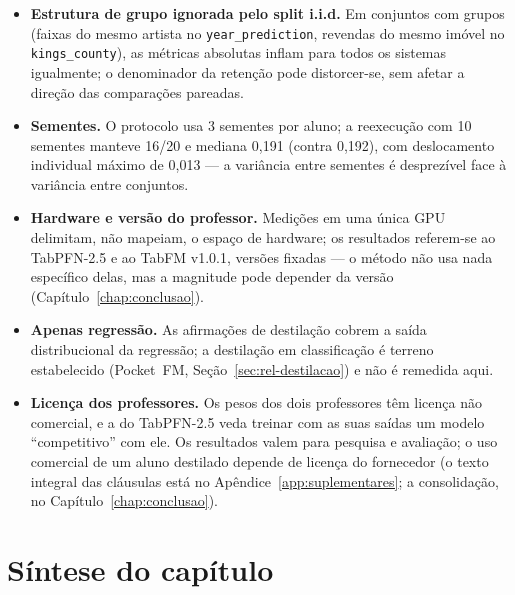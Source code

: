 \begin{itemize}
    Holm, ao nível de 5\%, no conjunto dos três testes de sinal
    principais (a manchete, com correção sequencial; E1; E3), os
    três se mantêm ($p$ ajustados $\approx 0{,}019$; $0{,}0026$;
    $0{,}0006$). Os instrumentos suplementares, já limítrofes
    isoladamente (Wilcoxon unilateral 0,045; Fisher 0,043), não se
    mantêm; e numa família que os incluísse, o $p$ ajustado da
    manchete seria 0,057.
  \item \textbf{Estrutura de grupo ignorada pelo split i.i.d.} Em
    conjuntos com grupos (faixas do mesmo artista no
    \texttt{year\_\allowbreak prediction}, revendas do mesmo imóvel no
    \texttt{kings\_county}), as métricas absolutas inflam para todos
    os sistemas igualmente; o denominador da retenção pode
    distorcer-se, sem afetar a direção das comparações pareadas.
  \item \textbf{Sementes.} O protocolo usa 3 sementes por aluno; a
    reexecução com 10 sementes manteve 16/20 e mediana 0,191 (contra
    0,192), com deslocamento individual máximo de 0,013 --- a
    variância entre sementes é desprezível face à variância entre
    conjuntos.
  \item \textbf{Hardware e versão do professor.} Medições em uma única
    GPU delimitam, não mapeiam, o espaço de hardware; os resultados
    referem-se ao TabPFN-2.5 e ao TabFM v1.0.1, versões fixadas ---
    o método não usa nada específico delas, mas a magnitude pode
    depender da versão (Capítulo~\ref{chap:conclusao}).
  \item \textbf{Apenas regressão.} As afirmações de destilação
    cobrem a saída distribucional da regressão; a destilação em
    classificação é terreno estabelecido (Pocket~FM,
    Seção~\ref{sec:rel-destilacao}) e não é remedida aqui.
  \item \textbf{Licença dos professores.} Os pesos dos dois
    professores têm licença não comercial, e a do TabPFN-2.5 veda
    treinar com as suas saídas um modelo ``competitivo'' com ele. Os
    resultados valem para pesquisa e avaliação; o uso comercial de um
    aluno destilado depende de licença do fornecedor (o texto
    integral das cláusulas está no Apêndice~\ref{app:suplementares};
    a consolidação, no Capítulo~\ref{chap:conclusao}).
\end{itemize}

\section{Síntese do capítulo}
\label{sec:destil-sintese}

